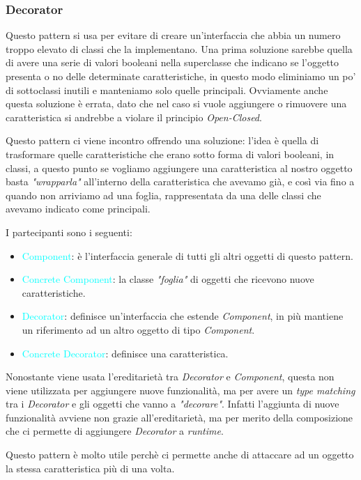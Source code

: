 \subsubsection{Decorator}

Questo pattern si usa per evitare di creare un'interfaccia
che abbia un numero troppo elevato di classi che la implementano.
Una prima soluzione sarebbe quella di avere una serie di valori booleani
nella superclasse che indicano se l'oggetto presenta o no delle determinate caratteristiche, in questo modo eliminiamo un po' di sottoclassi inutili
e manteniamo solo quelle principali. Ovviamente anche questa soluzione
è errata, dato che nel caso si vuole aggiungere o rimuovere una caratteristica
si andrebbe a violare il principio \emph{Open-Closed}.

Questo pattern ci viene incontro offrendo una soluzione: l'idea è quella di trasformare
quelle caratteristiche che erano sotto forma di valori booleani, in classi, a questo punto se vogliamo
aggiungere una caratteristica al nostro oggetto basta \emph{"wrapparla"} all'interno della caratteristica che avevamo già,
e così via fino a quando non arriviamo ad una foglia, rappresentata da una delle classi che avevamo indicato come principali.

I partecipanti sono i seguenti:
\begin{itemize}
    \item \textcolor{cyan}{Component}: è l'interfaccia generale di tutti gli altri oggetti di questo pattern.
    \item \textcolor{cyan}{Concrete Component}: la classe \emph{"foglia"} di oggetti che ricevono nuove caratteristiche.
    \item \textcolor{cyan}{Decorator}: definisce un'interfaccia che estende \emph{Component}, in più mantiene un riferimento
        ad un altro oggetto di tipo \emph{Component}.
    \item \textcolor{cyan}{Concrete Decorator}: definisce una caratteristica.
\end{itemize}

Nonostante viene usata l'ereditarietà tra \emph{Decorator} e \emph{Component}, questa non viene utilizzata per aggiungere nuove
funzionalità, ma per avere un \emph{type matching} tra i \emph{Decorator} e gli oggetti
che vanno a \emph{"decorare"}. Infatti l'aggiunta di nuove funzionalità avviene non grazie
all'ereditarietà, ma per merito della composizione che ci permette di aggiungere
\emph{Decorator} a \emph{runtime}.

Questo pattern è molto utile perchè ci permette anche di attaccare ad un
oggetto la stessa caratteristica più di una volta.

